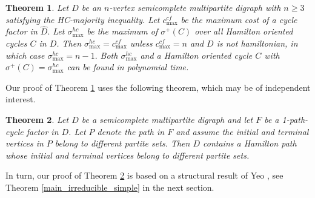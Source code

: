 \documentclass{article}
\newtheorem{theorem}{Theorem}[section]
\newcommand{\QG}[1]{{#1}}
\newcommand{\GGnn}[1]{{#1}}
\newcommand{\2}{\vspace{0.2cm}}
\begin{document}
\begin{theorem}\label{mthoc}
Let $D$ be an $n$-vertex semicomplete multipartite digraph \GGnn{with $n\ge 3$} satisfying the HC-majority inequality. \QG{Let $c^{cf}_{\max}$ be the maximum cost of a cycle factor in $\hat{D}.$} Let $\sigma^{hc}_{\max}$ be \GGnn{the maximum of $\sigma^+(C)$ over all Hamilton oriented cycles $C$ in $D$.}
Then $\sigma^{hc}_{\max}=c^{cf}_{\max}$ unless $c^{cf}_{\max}=n$ and $D$ is not hamiltonian, in which case $\sigma^{hc}_{\max}=n-1.$
Both $\sigma^{hc}_{\max}$ and a Hamilton oriented cycle $C$ with  $\sigma^+(C)=\sigma^{hc}_{\max}$ can be found in polynomial time.
\end{theorem}

Our proof of Theorem \ref{mthoc} uses the following theorem, which may be of independent interest.


\begin{theorem} \label{ham_path_diff_ends}
Let $D$ be a semicomplete multipartite digraph and let ${F}$ be a 1-path-cycle factor in $D$.
Let $P$ denote the path in ${F}$ and assume the initial and terminal vertices in $P$ belong to different partite sets.
Then $D$ contains a Hamilton path whose initial and terminal vertices belong to different partite sets.
\end{theorem}

In turn, our proof of Theorem \ref{ham_path_diff_ends} is based on a structural result of Yeo \cite{Y97}, \GGnn{see Theorem \ref{main_irreducible_simple} in the next section.}

\vspace{1mm}
\end{document}
